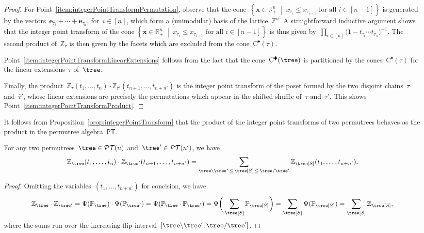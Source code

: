 \documentclass[ALCO]{cedram}
\newcommand{\R}{\mathbb{R}} %
\newcommand{\Z}{\mathbb{Z}} %
\renewcommand{\b}[1]{\mathbf{#1}} %
\newcommand{\set}[2]{\left\{ #1 \;\middle|\; #2 \right\}} %
\newcommand{\blackPolar}{^\blacklozenge} %
\newcommand{\Permutrees}{\mathcal{PT}} %
\newcommand{\Cone}{\mathrm{C}} %
\newcommand{\PermutreeAlgebra}{\mathsf{PT}} %
\newcommand{\integerPointTransform}{\mathbb{Z}} %
\newcommand{\product}{\cdot} %
\newcommand{\underprod}[2]{{#1}\backslash{#2}} %
\newcommand{\overprod}[2]{{#1}\slash{#2}} %
\newcommand{\PPT}{\mathbb{P}} %
\begin{document}
\begin{proof}
For Point~\eqref{item:integerPointTransformPermutation}, observe that the cone~$\set{\b{x} \in \R_+^n}{x_{\tau_i} \le x_{\tau_{i+1}} \text{ for all } i \in [n-1]}$ is generated by the vectors~$\b{e}_{\tau_i} + \cdots + \b{e}_{\tau_n}$, for~$i \in [n]$, which form a (unimodular) basis of the lattice~$\Z^n$. A straightforward inductive argument shows that the integer point transform of the cone $\set{\b{x} \in \R_+^n}{x_{\tau_i} \le x_{\tau_{i+1}} \text{ for all } i \in [n-1]}$ is thus given by~$\prod_{i \in [n]} \big( 1- t_{\tau_i} \cdots t_{\tau_n} \big)^{-1}$. The second product of~$\integerPointTransform_\tau$ is then given by the facets which are excluded from the cone~$\Cone\blackPolar(\tau)$.

Point~\eqref{item:integerPointTransformLinearExtensions} follows from the fact that the cone~$\Cone\blackPolar(\tree)$ is partitioned by the cones~$\Cone\blackPolar(\tau)$ for the linear extensions~$\tau$ of~$\tree$.

Finally, the product~$\integerPointTransform_\tau(t_1, \dots, t_n) \product \integerPointTransform_{\tau'}(t_{n+1}, \dots, t_{n+n'})$ is the integer point transform of the poset formed by the two disjoint chains~$\tau$ and~$\bar\tau'$, whose linear extensions are precisely the permutations which appear in the shifted shuffle of~$\tau$ and~$\tau'$. This shows Point~\eqref{item:integerPointTransformProduct}.
\end{proof}

It follows from Proposition~\ref{prop:integerPointTransform} that the product of the integer point transforms of two permutrees behaves as the product in the permutree algebra~$\PermutreeAlgebra$.

\begin{corollary}
For any two permutrees~$\tree \in \Permutrees(n)$ and~$\tree' \in \Permutrees(n')$, we have
\[
\integerPointTransform_{\tree}(t_1, \dots, t_n) \product \integerPointTransform_{\tree'}(t_{n+1}, \dots, t_{n+n'}) = \sum_{\underprod{\tree}{\tree'} \, \le \, \tree[S] \, \le \, \overprod{\tree}{\tree'}} \integerPointTransform_{\tree[S]}(t_1, \dots, t_{n+n'}).
\]
\end{corollary}

\begin{proof}
Omitting the variables~$(t_1, \dots, t_{n+n'})$ for concision, we have
\[
\integerPointTransform_{\tree} \product \integerPointTransform_{\tree'} = \Psi(\PPT_{\tree}) \product \Psi(\PPT_{\tree'}) = \Psi(\PPT_{\tree} \cdot \PPT_{\tree'}) = \Psi \bigg( \sum_{\tree[S]} \PPT_{\tree[S]} \bigg) = \sum_{\tree[S]} \Psi(\PPT_{\tree[S]}) = \sum_{\tree[S]} \integerPointTransform_{\tree[S]},
\]
where the sums run over the increasing flip interval~$[\underprod{\tree}{\tree'}, \overprod{\tree}{\tree'}]$.
\end{proof}
\end{document}
